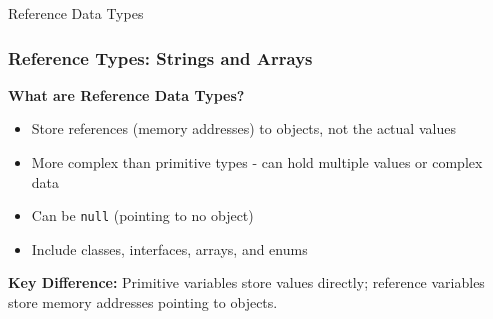 \documentclass[aspectratio=169]{beamer}
\begin{document}
\begin{frame}[fragile]{Reference Data Types}
    \frametitle{Reference Types: Strings and Arrays}
    
    \textbf{What are Reference Data Types?}
    \begin{itemize}
        \item Store references (memory addresses) to objects, not the actual values
        \item More complex than primitive types - can hold multiple values or complex data
        \item Can be \texttt{null} (pointing to no object)
        \item Include classes, interfaces, arrays, and enums
    \end{itemize}
    
    \vspace{0.3em}
    \small \textbf{Key Difference:} Primitive variables store values directly; reference variables store memory addresses pointing to objects.

\end{frame}
\end{document}
